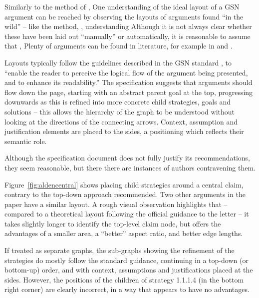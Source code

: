 Similarly to the method of \citet{5674033}, One understanding of the ideal layout of a GSN argument can be reached by observing the layouts of arguments found ``in the wild'' -- like the method, , understanding 
Although it is not always clear whether these have been laid out ``manually'' or automatically, it is reasonable to assume that , 
Plenty of arguments can be found in literature, for example in \cite{Habli:2006:PPC:1183088.1183090} and  \cite{insilico}.

Layouts typically follow the guidelines described in the GSN standard \citep[section~2.2, pp.~26--27]{gsnstandard},
to ``enable the reader to perceive the logical flow of the argument being presented, and to enhance its readability.''
The specification suggests that arguments should flow down the page, starting with an abstract parent goal at the top, progressing downwards as this is refined into more concrete child strategies, goals and solutions -- this allows the hierarchy of the graph to be understood without looking at the directions of the connecting arrows.
Context, assumption and justification elements are placed to the sides, a positioning which reflects their semantic role.

Although the specification document does not fully justify its recommendations, they seem reasonable, but there there are instances of authors contravening them.

Figure~\ref{fig:aldencentral} shows \citet{royal} placing child strategies around a central claim, contrary to the top-down approach recommended. Two other arguments in the paper \cite[pp.~8--9]{royal} have a similar layout.
A rough visual observation highlights that -- compared to a theoretical layout following the official guidance to the letter -- it takes slightly longer to identify the top-level claim node, but offers the advantages of a smaller area, a ``better'' aspect ratio, and better edge lengths. 

If treated as separate graphs, the sub-graphs showing the refinement of the strategies do mostly follow the standard guidance, continuing in a top-down (or bottom-up) order, and with context, assumptions and justifications placed at the sides. However, the positions of the children of strategy 1.1.1.4 (in the bottom right corner) are clearly incorrect, in a way that appears to have no advantages.

